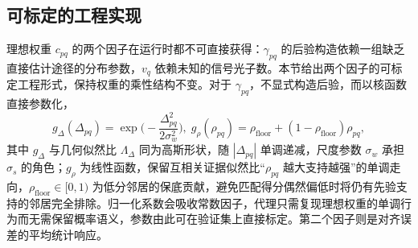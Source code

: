 \subsection{可标定的工程实现}
\label{sec:engineering}

理想权重 $c_{pq}$ 的两个因子在运行时都不可直接获得：$\gamma_{pq}$ 的后验构造依赖一组缺乏直接估计途径的分布参数，$v_q$ 依赖未知的信号光子数。本节给出两个因子的可标定工程形式，保持权重的乘性结构不变。对于 $\gamma_{pq}$，不显式构造后验，而以核函数直接参数化，
\begin{equation}
  g_{\Delta}(\Delta_{pq})=\exp\!\Big(-\frac{\Delta_{pq}^2}{2\sigma_w^2}\Big),
  \;
  g_{\rho}(\rho_{pq})=\rho_{\mathrm{floor}}+(1-\rho_{\mathrm{floor}})\rho_{pq},
  \label{eq:reliability}
\end{equation}
其中 $g_{\Delta}$ 与几何似然比 $\Lambda_{\Delta}$ 同为高斯形状，随 $|\Delta_{pq}|$ 单调递减，尺度参数 $\sigma_w$ 承担 $\sigma_s$ 的角色；$g_{\rho}$ 为线性函数，保留互相关证据似然比``$\rho_{pq}$ 越大支持越强''的单调走向，$\rho_{\mathrm{floor}}\in[0,1)$ 为低分邻居的保底贡献，避免匹配得分偶然偏低时将仍有先验支持的邻居完全排除。归一化系数会吸收常数因子，代理只需复现理想权重的单调行为而无需保留概率语义，参数由此可在验证集上直接标定。第二个因子则是对齐误差的平均统计响应。

